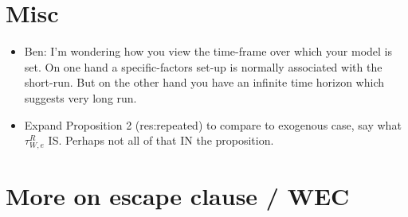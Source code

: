 \documentclass[12pt]{article}
\begin{document}
\section{Misc}
\begin{itemize}
	\item Ben: I'm wondering how you view the time-frame over which your model is set.  On one hand a specific-factors set-up is normally associated with the short-run.  But on the other hand you have an infinite time horizon which suggests very long run.
	\item Expand Proposition 2 (res:repeated) to compare to exogenous case, say what $\tau^R_{W,e}$ IS. Perhaps not all of that IN the proposition.
\end{itemize}


\section{More on escape clause / WEC}
\end{document}
